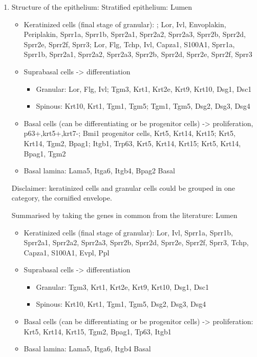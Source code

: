 \documentclass[
  letterpaper,
  DIV=11,
  numbers=noendperiod]{scrreprt}
\providecommand{\tightlist}{%
  \setlength{\itemsep}{0pt}\setlength{\parskip}{0pt}}\usepackage{longtable,booktabs,array}
\begin{document}
\begin{enumerate}
\def\labelenumi{\arabic{enumi}.}
\setcounter{enumi}{1}
\item
  Structure of the epithelium: Stratified epithelium: Lumen

  \begin{itemize}
  \tightlist
  \item
    Keratinized cells (final stage of granular): ; Lor, Ivl, Envoplakin,
    Periplakin, Sprr1a, Sprr1b, Sprr2a1, Sprr2a2, Sprr2a3, Sprr2b,
    Sprr2d, Sprr2e, Sprr2f, Sprr3; Lor, Flg, Tchp, Ivl, Capza1, S100A1,
    Sprr1a, Sprr1b, Sprr2a1, Sprr2a2, Sprr2a3, Sprr2b, Sprr2d, Sprr2e,
    Sprr2f, Sprr3
  \item
    Suprabasal cells -\textgreater{} differentiation

    \begin{itemize}
    \tightlist
    \item
      Granular: Lor, Flg, Ivl; Tgm3, Krt1, Krt2e, Krt9, Krt10, Dsg1,
      Dsc1
    \item
      Spinous: Krt10, Krt1, Tgm1, Tgm5; Tgm1, Tgm5, Dsg2, Dsg3, Dsg4
    \end{itemize}
  \item
    Basal cells (can be differentiating or be progenitor cells)
    -\textgreater{} proliferation, p63+,krt5+,krt7-; Bmi1 progenitor
    cells, Krt5, Krt14, Krt15; Krt5, Krt14, Tgm2, Bpag1; Itgb1, Trp63,
    Krt5, Krt14, Krt15; Krt5, Krt14, Bpag1, Tgm2
  \item
    Basal lamina: Lama5, Itga6, Itgb4, Bpag2 Basal
  \end{itemize}

  Disclaimer: keratinized cells and granular cells could be grouped in
  one category, the cornified envelope.

  Summarised by taking the genes in common from the literature: Lumen

  \begin{itemize}
  \tightlist
  \item
    Keratinized cells (final stage of granular): Lor, Ivl, Sprr1a,
    Sprr1b, Sprr2a1, Sprr2a2, Sprr2a3, Sprr2b, Sprr2d, Sprr2e, Sprr2f,
    Sprr3, Tchp, Capza1, S100A1, Evpl, Ppl
  \item
    Suprabasal cells -\textgreater{} differentiation

    \begin{itemize}
    \tightlist
    \item
      Granular: Tgm3, Krt1, Krt2e, Krt9, Krt10, Dsg1, Dsc1
    \item
      Spinous: Krt10, Krt1, Tgm1, Tgm5, Dsg2, Dsg3, Dsg4
    \end{itemize}
  \item
    Basal cells (can be differentiating or be progenitor cells)
    -\textgreater{} proliferation: Krt5, Krt14, Krt15, Tgm2, Bpag1,
    Tp63, Itgb1
  \item
    Basal lamina: Lama5, Itga6, Itgb4 Basal
  \end{itemize}
\end{enumerate}
\end{document}
